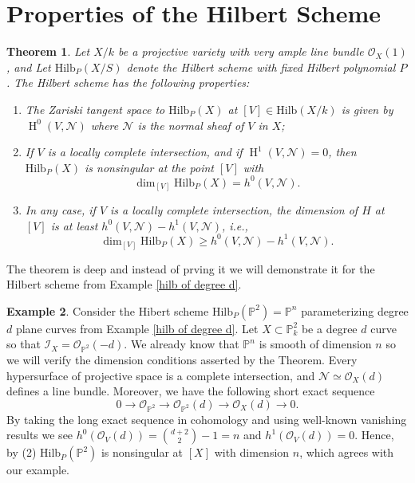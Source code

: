 \documentclass[12pt]{amsart}
\newtheorem{theorem}{Theorem}[section]
\numberwithin{equation}{section}
\theoremstyle{definition}
\newtheorem{example}[theorem]{Example}
\newcommand{\PP}{\mathbb{P}}
\newcommand{\HH}{\operatorname{H}}
\newcommand{\Hilb}{\mathrm{Hilb}}
\begin{document}
\section{Properties of the Hilbert Scheme}

\begin{theorem}
    Let $X/k$ be a projective variety with very ample line bundle $\mathcal{O}_X(1)$, and
    Let $\Hilb_P(X/S)$ denote the Hilbert scheme with fixed Hilbert polynomial $P$. 
    The Hilbert scheme has the following properties:
    \begin{enumerate}
        \item The Zariski tangent space to $\Hilb_P(X)$ at $[V] \in \Hilb(X/k)$ is given by $\HH^0(V, \mathcal{N})$ where $\mathcal{N}$ is the normal sheaf of $V$ in $X$;
        \item If $V$ is a locally complete intersection, and if $\HH^1(V, \mathcal{N}) = 0$, then $\Hilb_P(X)$ is nonsingular at the point $[V]$ with
        \[
        \dim_{[V]}\Hilb_P(X) = h^0(V, \mathcal{N}).
        \] 
        \item In any case, if $V$ is a locally complete intersection, the dimension of $H$ at $[V]$ is at least $h^0(V, \mathcal{N}) - h^1(V, \mathcal{N})$, i.e.,
        \[
        \dim_{[V]}\Hilb_P(X) \ge h^0(V, \mathcal{N}) - h^1(V, \mathcal{N}).
        \]
    \end{enumerate}
\end{theorem}

The theorem is deep and instead of prving it we will demonstrate it for the Hilbert scheme from Example \ref{hilb of degree d}.

\begin{example}
    Consider the Hibert scheme $\Hilb_P(\PP^2) = \PP^n$ parameterizing degree $d$ plane curves from Example \ref{hilb of degree d}.
    Let $X \subset \PP^2_k$ be a degree $d$ curve so that $\mathcal{I}_X = \mathcal{O}_{\PP^2}(-d).$
    We already know that $\PP^n$ is smooth of dimension $n$ so we will verify the dimension conditions asserted by the Theorem.
    Every hypersurface of projective space is a complete intersection, and $\mathcal{N} \simeq \mathcal{O}_X(d)$ defines a line bundle.
    Moreover, we have the following short exact sequence
    \[
    0 \to \mathcal{O}_{\PP^2} \to \mathcal{O}_{\PP^2}(d) \to \mathcal{O}_X(d) \to 0.
    \]
    By taking the long exact sequence in cohomology and using well-known vanishing results we see $h^0(\mathcal{O}_V(d)) = {{d+2}\choose{2}}-1 = n$ and $h^1(\mathcal{O}_V(d)) = 0.$
    Hence, by (2) $\Hilb_P(\PP^2)$ is nonsingular at $[X]$ with dimension $n$, which agrees with our example. 
\end{example}
\end{document}
